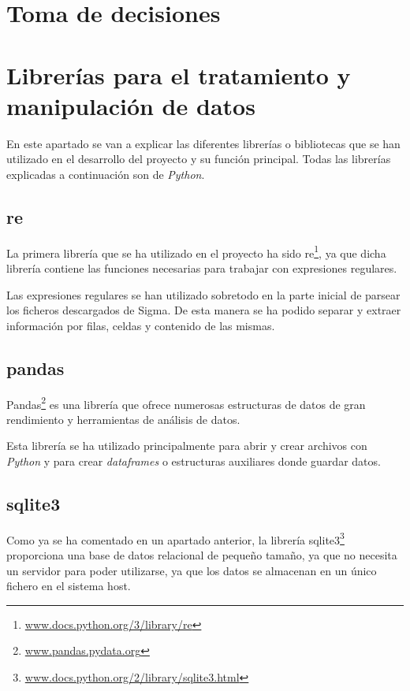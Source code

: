 \section{Toma de decisiones}\label{toma_de_decisiones}


\section{Librerías para el tratamiento y manipulación de datos}\label{librerias}
En este apartado se van a explicar las diferentes librerías o bibliotecas que se han utilizado en el desarrollo del proyecto y su función principal. Todas las librerías explicadas a continuación son de \emph{Python}.

\subsection{re}
La primera librería que se ha utilizado en el proyecto ha sido re\footnote{\href {https://docs.python.org/3/library/re.html}{www.docs.python.org/3/library/re}}, ya que dicha librería contiene las funciones necesarias para trabajar con expresiones regulares.

Las expresiones regulares se han utilizado sobretodo en la parte inicial de parsear los ficheros descargados de Sigma. De esta manera se ha podido separar y extraer información por filas, celdas y contenido de las mismas.


\subsection{pandas}
Pandas\footnote{\href{https://pandas.pydata.org/}{www.pandas.pydata.org}} es una librería que ofrece numerosas estructuras de datos de gran rendimiento y herramientas de análisis de datos.

Esta librería se ha utilizado principalmente para abrir y crear archivos con \emph{Python} y para crear \emph{dataframes} o estructuras auxiliares donde guardar datos.  


\subsection{sqlite3}
Como ya se ha comentado en un apartado anterior, la librería sqlite3\footnote{\href{https://docs.python.org/2/library/sqlite3.html}{www.docs.python.org/2/library/sqlite3.html}} proporciona una base de datos relacional de pequeño tamaño, ya que no necesita un servidor para poder utilizarse, ya que los datos se almacenan en un único fichero en el sistema host.

